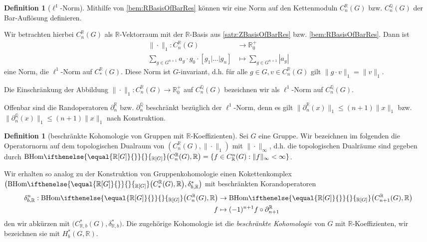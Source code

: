 \documentclass[a4paper,twoside,10pt]{scrreprt}
\newcommand{\Q}{\mathbb{Q}}
\newcommand{\R}{\mathbb{R}}
\newcommand{\BHom}[2][]{\text{BHom}%
\ifthenelse{\equal{#1}{}}{}{_{#1}}%
\bigl(#2\bigr)}%
\theoremstyle{definition}
\newtheorem{definition}[satz]{Definition}
\begin{document}
\begin{definition}[$\ell^1$-Norm]
Mithilfe von \cref{bem:RBasisOfBarRes} können wir eine Norm auf den Kettenmoduln $C_n^{\R}(G)$ bzw. $C_n^{\Q}(G)$ der Bar-Auflösung definieren.\par
Wir betrachten hierbei $C_n^{\R}(G)$ als $\R$-Vektorraum mit der $\R$-Basis aus \cref{satz:ZBasisOfBarRes} bzw. \cref{bem:RBasisOfBarRes}. Dann ist
\begin{align*}
\|\cdot\|_1:C_n^{\R}(G)&\to\R_0^+\\
\sum\limits_{g\in {G^{n+1}}} a_g\cdot g_0\cdot [g_1|\ldots|g_n]&\mapsto\sum\limits_{g\in {G^{n+1}}} |a_g|
\end{align*}
eine Norm, die $\ell^1$-Norm auf $C_*^{\R}(G)$. Diese Norm ist $G$-invariant, d.h. für alle $g\in G, v\in C_n^{\R}(G)$ gilt $\|g\cdot v\|_1=\|v\|_1$.\par
Die Einschränkung der Abbildung $\|\cdot\|_1:C_n^{\R}(G)\to\R_0^+$ auf $C_n^{\Q}(G)$ bezeichnen wir als $\ell^1$-Norm auf $C_n^{\Q}(G)$.\par
Offenbar sind die Randoperatoren $\partial_n^{\R}$ bzw. $\partial_n^{\Q}$ beschränkt bezüglich der $\ell^1$-Norm, denn es gilt $\|\partial_n^{\R}(x)\|_1\leq (n+1)\|x\|_1$ bzw.  $\|\partial_n^{\Q}(x)\|_1\leq (n+1)\|x\|_1$ nach Konstruktion.
\end{definition}

\begin{definition}[beschränkte Kohomologie von Gruppen mit $\R$-Koeffizienten]
Sei $G$ eine Gruppe. Wir bezeichnen im folgenden die Operatornorm auf dem topologischen Dualraum von $\left(C_n^{\R}(G),\|\cdot\|_1\right)$ mit $\|\cdot\|_{\infty}$, d.h. die topologischen Dualräume sind gegeben durch $\BHom[\R{[}G{]}]{C_n^{\R}(G),\R}=\{f\in C_{\R}^n(G):\|f\|_{\infty}< \infty\}$.\par
Wir erhalten so analog zu der Konstruktion von Gruppenkohomologie einen Kokettenkomplex $\bigl(\BHom[\R{[}G{]}]{C_*^{\R}(G),\R},\delta_{b,\R}^*\bigr)$ mit beschränkten Korandoperatoren
\begin{align*}
\delta_{b,\R}^n:\BHom[\R{[}G{]}]{C_n^{\R}(G),\R}&\to \BHom[\R{[}G{]}]{C_{n+1}^{\R}(G),\R}\\
f&\mapsto (-1)^{n+1}f\circ \partial_{n+1}^{\R}
\end{align*}
den wir abkürzen mit $\bigl(C_{\R,b}^*(G),\delta_{\R,b}^*\bigr)$. Die zugehörige Kohomologie ist die \emph{beschränkte Kohomologie} von $G$ mit $\R$-Koeffizienten, wir bezeichnen sie mit $H_b^*(G,\R)$.
\end{definition}
\end{document}
